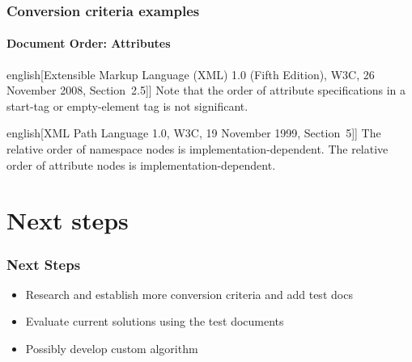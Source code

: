 \documentclass[
    alternativetitlepage=alternativ,
    cornerlogo=hgi_nds_logo2,
    sectionoverview,
]{rubpresentation}
\begin{document}
\begin{frame}
    \frametitle{Conversion criteria examples}
    \framesubtitle{Document Order: Attributes}
    \begin{foreigndisplayquote}{english}[{Extensible Markup Language (XML) 1.0 (Fifth Edition), W3C, 26 November 2008, Section~2.5]}]
Note that the order of attribute specifications in a start-tag or empty-element tag is not significant.
    \end{foreigndisplayquote}
    \begin{foreigndisplayquote}{english}[{XML Path Language 1.0, W3C, 19 November 1999, Section~5]}]
The relative order of namespace nodes is implementation-dependent. The relative order of attribute nodes is implementation-dependent.
    \end{foreigndisplayquote}
\end{frame}

\section{Next steps}

\begin{frame}
    \frametitle{Next Steps}
    \begin{itemize}
        \item{} Research and establish more conversion criteria and add test docs
        \item{} Evaluate current solutions using the test documents
        \item{} Possibly develop custom algorithm
    \end{itemize}
\end{frame}

\end{document}
